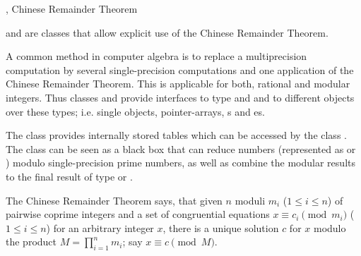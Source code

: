 
\newcommand{\primebound}{\mathit{prime\uscore bound}}
\newcommand{\primes}{\mathit{Primes}}
\newcommand{\smallvec}{\mathit{small\uscore vec}}
\newcommand{\bigvec}{\mathit{big\uscore vec}}
\newcommand{\smallmat}{\mathit{small\uscore mat}}
\newcommand{\bigmat}{\mathit{big\uscore mat}}



\NAME

,  \dotfill Chinese Remainder Theorem



\ABSTRACT

 and  are classes that allow explicit use of the Chinese Remainder
Theorem.

A common method in computer algebra is to replace a multiprecision computation by several
single-precision computations and one application of the Chinese Remainder Theorem.  This is
applicable for both, rational and modular integers.  Thus classes  and
 provide interfaces to type  and  and to different objects
over these types; i.e. single objects, pointer-arrays, s and
es.

The class  provides internally stored tables which can be accessed by the class
.  The class  can be seen as a black box that can reduce numbers
(represented as  or ) modulo single-precision prime numbers, as well
as combine the modular results to the final result of type  or .



\DESCRIPTION

The Chinese Remainder Theorem says, that given $n$ moduli $m_i$ ($1 \leq i \leq n$) of pairwise
coprime integers and a set of congruential equations $x \equiv c_i \pmod{m_i}$ ($1 \leq i \leq
n$) for an arbitrary integer $x$, there is a unique solution $c$ for $x$ modulo the product $M =
\prod_{i=1}^n m_i$; say $x \equiv c \pmod{M}$.


